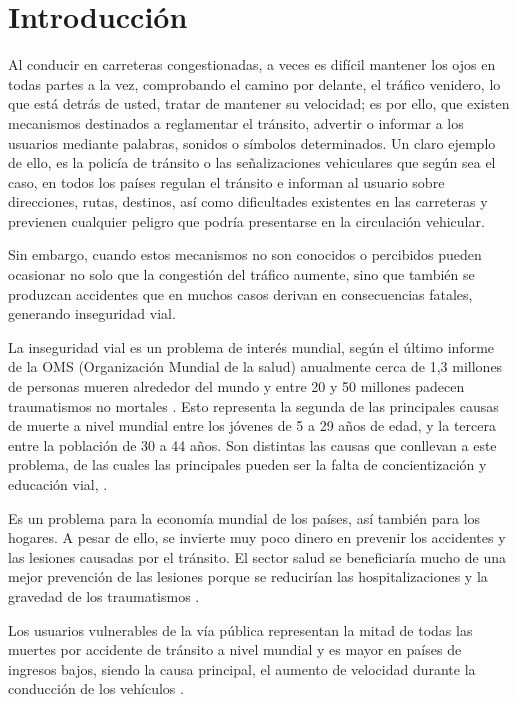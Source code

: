 \chapter{Introducción}
	\setcounter{page}{1}
	\renewcommand{\baselinestretch}{1} %
	Al conducir en carreteras congestionadas, a veces es difícil mantener los ojos en todas partes a la vez, comprobando el camino por delante, el tráfico venidero, lo que está detrás de usted, tratar de mantener su velocidad; es por ello, que existen mecanismos destinados a reglamentar el tránsito, advertir o informar a los usuarios mediante palabras, sonidos o símbolos determinados. Un claro ejemplo de ello, es la policía de tránsito o las señalizaciones vehiculares que según sea el caso, en todos los países regulan el tránsito e informan al usuario sobre direcciones, rutas, destinos, así como dificultades existentes en las carreteras y previenen cualquier peligro que podría presentarse en la circulación vehicular.

	\vskip 0.15cm
	Sin embargo, cuando estos mecanismos no son conocidos o percibidos pueden ocasionar no solo que la congestión del tráfico aumente, sino que también se produzcan accidentes que en muchos casos derivan en consecuencias fatales, generando inseguridad vial.

	\vskip 0.15cm
	La inseguridad vial es un problema de interés mundial, según el último informe de la OMS (Organización Mundial de la salud) anualmente cerca de 1,3 millones de personas mueren alrededor del mundo y entre 20 y 50 millones padecen traumatismos no mortales \citep{OMS}. Esto representa la segunda de las principales causas de muerte a nivel mundial entre los jóvenes de 5 a 29 años de edad, y la tercera entre la población de 30 a 44 años. Son distintas las causas que conllevan a este problema, de las cuales las principales pueden ser la falta de concientización y educación vial, \citep{OMS}. 
	
	\vskip 0.15cm	
	Es un problema para la economía mundial de los países, así también para los hogares. A pesar de ello, se invierte muy poco dinero en prevenir los accidentes y las lesiones causadas por el tránsito. El sector salud se beneficiaría mucho de una mejor prevención de las lesiones porque se reducirían las hospitalizaciones y la gravedad de los traumatismos \citep{CNSV}.

	\vskip 0.15cm
	Los usuarios vulnerables de la vía pública representan la mitad de todas las muertes por accidente de tránsito a nivel mundial y es mayor en países de ingresos bajos, siendo la causa principal, el aumento de velocidad durante la conducción de los vehículos \citep{OMS}.

